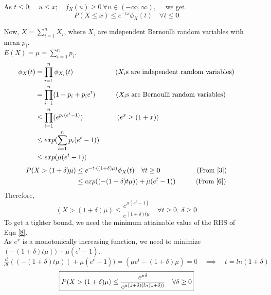 \documentclass[11pt, fleqn]{article}
\begin{document}
As $t \le 0;\quad u \le x; \quad f_X(u) \ge 0 \  \forall u\in(-\infty, \infty), \quad$ we get
\begin{equation}
    \boxed{ P(X \le x) \le e^{-tx} \phi_X(t) \quad \forall t \le 0}
\end{equation}

\newpage
Now, $X = \sum_{i=1}^{n} X_i$, where $X_i$ are independent Bernoulli random variables with mean $p_i$.\\
$E(X) = \mu = \sum_{i=1}^{n} p_i$.\\
\begin{equation}
    \label{6}
    \begin{split}
        \phi_X(t) &= \prod_{i=1}^{n} \phi_{X_i}(t) \hspace{6.2em} (X_i \text{s are independent random variables}) \\
            &= \prod_{i=1}^{n} (1 - p_i + p_i e^{t}) \hspace{3em} (X_i \text{s are Bernoulli random variables}) \\
            &\le \prod_{i=1}^{n} (e^{p_i(e^t - 1)}) \hspace{5em} (e^x \ge (1 + x)) \\
            &\le exp(\sum_{i=1}^{n} p_i(e^t - 1)) \\
            &\le exp(\mu (e^t - 1)) \\
    \end{split}
\end{equation}
\begin{equation}
    \begin{split}
        P(X > (1 + \delta) \mu) &\le e^{-t \cdot ((1 + \delta) \mu)} \phi_X(t) \quad \forall t \ge 0 \hspace{5.4em} (\text{From \ref{3}}) \\
            &\le exp((-(1 + \delta) t \mu)) + \mu (e^t - 1)) \hspace{3em} (\text{From \ref{6}})
    \end{split}
\end{equation}
Therefore,
\begin{equation}
    \label{8}
    \boxed{(X > (1 + \delta) \mu) \le \frac{e^{\mu(e^t-1)}}{e^{(1+\delta)t\mu}} \quad \forall t \ge 0, \ \delta \ge 0}
\end{equation}
To get a tighter bound, we need the minimum attainable value of the RHS of Eqn \ref{8}. \\
As $e^x$ is a monotonically increasing function, we need to minimize $(-(1 + \delta) t \mu)) + \mu (e^t - 1)$.\\
$\frac{d}{dt} ((-(1 + \delta) t \mu)) + \mu (e^t - 1)) = (\mu e^t - (1 + \delta) \mu) = 0 \quad \implies \quad \boxed{t = ln(1 + \delta)}$ \\
\begin{equation}
    \boxed{P(X > (1 + \delta) \mu) \le \frac{e^{\mu\delta}}{e^{\mu(1+\delta)(ln(1 + \delta))}} \quad \forall \delta \ge 0} \\
\end{equation}
\end{document}
